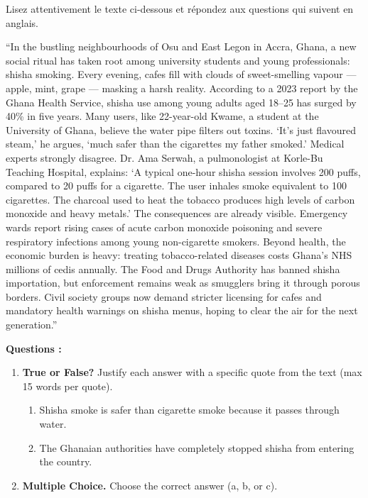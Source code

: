 \documentclass[11pt]{article}
\begin{document}
\begin{exercice}
Lisez attentivement le texte ci-dessous et répondez aux questions qui suivent en anglais.
\begin{textebox}
“In the bustling neighbourhoods of Osu and East Legon in Accra, Ghana, a new social ritual has taken root among university students and young professionals: shisha smoking. Every evening, cafes fill with clouds of sweet-smelling vapour — apple, mint, grape — masking a harsh reality. According to a 2023 report by the Ghana Health Service, shisha use among young adults aged 18--25 has surged by 40\% in five years. Many users, like 22-year-old Kwame, a student at the University of Ghana, believe the water pipe filters out toxins. ‘It’s just flavoured steam,’ he argues, ‘much safer than the cigarettes my father smoked.’ Medical experts strongly disagree. Dr. Ama Serwah, a pulmonologist at Korle-Bu Teaching Hospital, explains: ‘A typical one-hour shisha session involves 200 puffs, compared to 20 puffs for a cigarette. The user inhales smoke equivalent to 100 cigarettes. The charcoal used to heat the tobacco produces high levels of carbon monoxide and heavy metals.’ The consequences are already visible. Emergency wards report rising cases of acute carbon monoxide poisoning and severe respiratory infections among young non-cigarette smokers. Beyond health, the economic burden is heavy: treating tobacco-related diseases costs Ghana’s NHS millions of cedis annually. The Food and Drugs Authority has banned shisha importation, but enforcement remains weak as smugglers bring it through porous borders. Civil society groups now demand stricter licensing for cafes and mandatory health warnings on shisha menus, hoping to clear the air for the next generation.”
\end{textebox}
\textbf{Questions :}
\begin{enumerate}
    \item \textbf{True or False?} Justify each answer with a specific quote from the text (max 15 words per quote).
    \begin{enumerate}
        \item Shisha smoke is safer than cigarette smoke because it passes through water.
        \item The Ghanaian authorities have completely stopped shisha from entering the country.
    \end{enumerate}
    \item \textbf{Multiple Choice.} Choose the correct answer (a, b, or c).

\end{enumerate}
\end{exercice}
\end{document}
